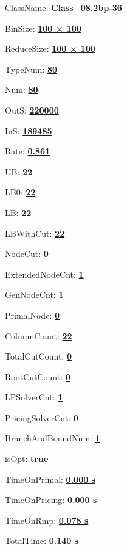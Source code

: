 \documentclass[11pt]{article}
\begin{document}
\pagestyle{empty}


ClassName: \underline{\textbf{Class_08.2bp-36}}
\par
BinSize: \underline{\textbf{100 × 100}}
\par
ReduceSize: \underline{\textbf{100 × 100}}
\par
TypeNum: \underline{\textbf{80}}
\par
Num: \underline{\textbf{80}}
\par
OutS: \underline{\textbf{220000}}
\par
InS: \underline{\textbf{189485}}
\par
Rate: \underline{\textbf{0.861}}
\par
UB: \underline{\textbf{22}}
\par
LB0: \underline{\textbf{22}}
\par
LB: \underline{\textbf{22}}
\par
LBWithCut: \underline{\textbf{22}}
\par
NodeCut: \underline{\textbf{0}}
\par
ExtendedNodeCnt: \underline{\textbf{1}}
\par
GenNodeCnt: \underline{\textbf{1}}
\par
PrimalNode: \underline{\textbf{0}}
\par
ColumnCount: \underline{\textbf{22}}
\par
TotalCutCount: \underline{\textbf{0}}
\par
RootCutCount: \underline{\textbf{0}}
\par
LPSolverCnt: \underline{\textbf{1}}
\par
PricingSolverCnt: \underline{\textbf{0}}
\par
BranchAndBoundNum: \underline{\textbf{1}}
\par
isOpt: \underline{\textbf{true}}
\par
TimeOnPrimal: \underline{\textbf{0.000 s}}
\par
TimeOnPricing: \underline{\textbf{0.000 s}}
\par
TimeOnRmp: \underline{\textbf{0.078 s}}
\par
TotalTime: \underline{\textbf{0.140 s}}
\par
\newpage


\end{document}
